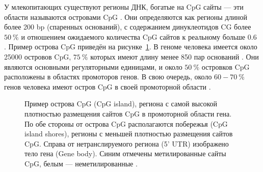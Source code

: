 У млекопитающих существуют регионы ДНК, богатые на CpG сайты --- эти области называются островами CpG \autocite{Bird1986}. Они определяются как регионы длиной более 200 bp (спаренных оснований), с содержанием динуклеотидов CG более $50~\%$ и отношением ожидаемого количества CpG сайтов к реальному больше $0.6$ \autocite{GardinerGarden1987}. Пример острова CpG приведён на рисунке~\cref{fig:CpG_Island}. В геноме человека имеется около 25000 островов CpG, $75~\%$  которых имеют длину менее 850 пар оснований \autocite{Lander2001}. Они являются основными регуляторными единицами, и около $50~\%$ островков CpG расположены в областях промоторов генов. В свою очередь, около $60-70~\%$ генов человека имеют остров CpG в своей промоторной области \autocite{Illingworth2010, Saxonov2006}.

\begin{figure}[ht]
	\caption[Пример острова CpG, региона с самой высокой плотностью размещения сайтов CpG в промоторной области гена.]{Пример острова CpG (CpG island), региона с самой высокой плотностью размещения сайтов CpG в промоторной области гена. По обе стороны от острова CpG располагаются побережья (CpG island shores), регионы с меньшей плотностью размещения сайтов CpG. Справа от нетранслируемого региона (5' UTR) изображено тело гена (Gene body). Синим отмечены метилированные сайты CpG, белым --- неметилированные \autocite{Fu2017}.}\label{fig:CpG_Island}
\end{figure}

